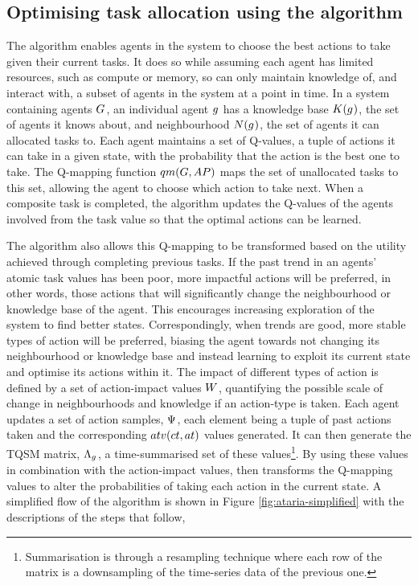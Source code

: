\subsection{Optimising task allocation using the \acronymATARIA{}{} algorithm}
\label{section:solution_ataria}

The \acronymATARIA{}{} algorithm enables agents in the system to choose the best actions to take given their current tasks. It does so while assuming each agent has limited resources, such as compute or memory, so can only maintain knowledge of,  and interact with,  a subset of agents in the system at a point in time. In a system containing agents $G_{}^{}$, an individual agent $g_{}^{}$ has a knowledge base $\functionKnowledgeSignature{}{}$, the set of agents it knows about, and neighbourhood $\functionNeighbourhoodSignature{}{}$, the set of agents it can allocated tasks to. Each agent maintains a set of Q-values, a tuple of actions it can take in a given state, with the probability that the action is the best one to take. The  Q-mapping function $\functionQMappingSignature{}{}$ maps the set of unallocated tasks to this set, allowing the agent to choose which action to take next. When a composite task is completed, the algorithm updates the Q-values of the agents involved from the task value so that the optimal actions can be learned.

The \acronymATARIA{}{} algorithm also allows this Q-mapping to be transformed based on the utility achieved through completing previous tasks. If the past trend in an agents'  atomic task values has been poor, more impactful actions will be preferred, in other words, those actions that will significantly change the neighbourhood or knowledge base of the agent. This encourages increasing exploration of the system to find better states. Correspondingly, when trends are good, more stable types of action will be preferred, biasing the agent towards not changing its neighbourhood or knowledge base and instead learning to exploit its current state and optimise its actions within it. The impact of different types of action is defined by a set of action-impact values $\setRiskAction{}{}$, quantifying  the possible scale of change in neighbourhoods and knowledge if an action-type is taken. Each agent updates a set of action samples, $\setActionSample{}{}$, each element being a tuple of past actions taken and the corresponding $\functionTaskAbsoluteValue{}{}$ values generated. It can then generate the TQSM matrix, $\setRewardSet{\varAgent{}{}}{}$, a time-summarised set of these values\footnote{Summarisation is through a resampling technique where each row of the matrix is a downsampling of the time-series data of the previous one.}. By using these values in combination with the action-impact values, \acronymATARIA{}{} then transforms the Q-mapping values to alter the probabilities of taking each action in the current state. A simplified flow of the \acronymATARIA{}{} algorithm is shown in Figure \ref{fig:ataria-simplified} with the descriptions of the steps that follow,

